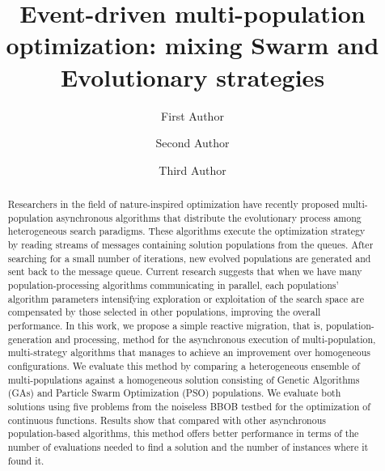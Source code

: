 \documentclass[runningheads]{llncs}
\begin{document}
%
\title{Event-driven multi-population optimization: mixing Swarm and Evolutionary strategies}
%
%
\author{First Author \and
Second Author \and
Third Author}
%
%
%
\maketitle              %
%
\begin{abstract}

Researchers in the field of nature-inspired optimization have recently
proposed multi-population asynchronous algorithms that distribute the
evolutionary process among heterogeneous search paradigms. These algorithms
execute the optimization strategy by reading streams of messages
containing solution populations from the queues. After searching for a
small number of iterations, new evolved populations are generated and
sent back to the message queue. Current research suggests that when we have
many population-processing algorithms communicating in parallel, each populations'
algorithm parameters intensifying exploration or exploitation of the
search space are compensated by those selected in
other populations,
improving the overall performance. %
In this work, we propose a simple reactive migration, that is,
population-generation and processing, method for the
asynchronous execution of multi-population, multi-strategy algorithms that
manages to achieve an improvement over homogeneous configurations. We
evaluate this method by comparing a
heterogeneous ensemble of multi-populations against a homogeneous solution
consisting of Genetic Algorithms (GAs) and Particle Swarm Optimization (PSO)
populations. We evaluate both solutions using five problems from the noiseless
BBOB testbed for the optimization of continuous functions. Results show that
compared with other asynchronous population-based algorithms, %
this method offers better performance in terms of the number of evaluations needed
to find a solution and the number of instances where it found it.

\end{abstract}
%
%
%
\end{document}
